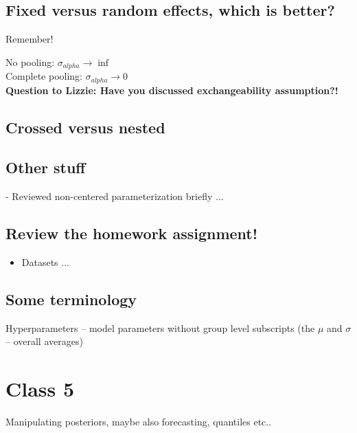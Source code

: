 \documentclass[11pt]{article}
\begin{document}

\subsection{Fixed versus random effects, which is better?}
Remember!

No pooling: $\sigma_{alpha} \rightarrow \inf$\\ %
Complete pooling: $\sigma_{alpha} \rightarrow 0$\\


{\bf Question to Lizzie: Have you discussed exchangeability assumption?!}

\subsection{Crossed versus nested} %

\subsection{Other stuff}
- Reviewed non-centered parameterization briefly ... 

\subsection{Review the homework assignment!}
\begin{itemize}
\item Datasets ... 
\end{itemize}

\subsection{Some terminology} %
Hyperparameters -- model parameters without group level subscripts (the $\mu$ and $\sigma$ -- overall averages)


\newpage
\section{Class 5} 

Manipulating posteriors, maybe also forecasting, quantiles etc..
\end{document}
